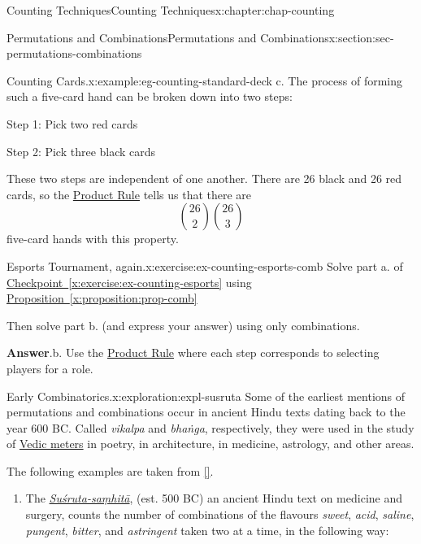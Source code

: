\documentclass[oneside,10pt,]{book}
\newcommand{\blocktitlefont}{\relax}
\newcommand{\xreffont}{\relax}
\newcommand{\pubtitle}[1]{\textsl{#1}}
\numberwithin{equation}{section}
\begin{document}
\begin{chapterptx}{Counting Techniques}{}{Counting Techniques}{}{}{x:chapter:chap-counting}
\begin{sectionptx}{Permutations and Combinations}{}{Permutations and Combinations}{}{}{x:section:sec-permutations-combinations}
\begin{example}{Counting Cards.}{x:example:eg-counting-standard-deck}
c. The process of forming such a five-card hand can be broken down into two steps:%
\begin{sidebyside}{2}{0.05}{0.05}{0.1}%
\begin{sbspanel}{0.4}%
Step 1: Pick two red cards%
\end{sbspanel}%
\begin{sbspanel}{0.4}%
\par
Step 2: Pick three black cards%
\end{sbspanel}%
\end{sidebyside}%
\par
These two steps are independent of one another. There are 26 black and 26 red cards, so the \hyperref[x:principle:prin-prod-rule]{Product Rule} tells us that there are%
\begin{equation*}
\binom{26}{2}\binom{26}{3}
\end{equation*}
five-card hands with this property.%
\end{example}
\begin{inlineexercise}{Esports Tournament, again.}{x:exercise:ex-counting-esports-comb}%
Solve part a. of \hyperref[x:exercise:ex-counting-esports]{Checkpoint~{\xreffont\ref{x:exercise:ex-counting-esports}}} using \hyperref[x:proposition:prop-comb]{Proposition~{\xreffont\ref{x:proposition:prop-comb}}}%
\par
Then solve part b. (and express your answer) using only combinations.%
\par\smallskip%
\noindent\textbf{\blocktitlefont Answer}.\hypertarget{g:answer:id332422}{}\quad{}b. Use the \hyperref[x:principle:prin-prod-rule]{Product Rule} where each step corresponds to selecting players for a role.%
\end{inlineexercise}
\begin{exploration}{Early Combinatorics.}{x:exploration:expl-susruta}%
Some of the earliest mentions of permutations and combinations occur in ancient Hindu texts dating back to the year 600 BC. Called \emph{vikalpa} and \emph{bhaṅga}, respectively, they were used in the study of \href{https://en.wikipedia.org/wiki/Sanskrit_prosody}{Vedic meters} in poetry, in architecture, in medicine, astrology, and other areas.%
\par
The following examples are taken from \hyperlink{x:biblio:bib-kolachana-2019}{[{\xreffont 2}]}.%
\begin{enumerate}[font=\bfseries,label=(\alph*),ref=\alph*]
\item{}The \href{https://en.wikipedia.org/wiki/Sushruta_Samhita}{\pubtitle{Suśruta-saṃhitā}}, (est. 500 BC) an ancient Hindu text on medicine and surgery, counts the number of combinations of the flavours \emph{sweet}, \emph{acid}, \emph{saline}, \emph{pungent}, \emph{bitter}, and \emph{astringent} taken two at a time, in the following way:%

\end{enumerate}
\end{exploration}
\end{sectionptx}
\end{chapterptx}
\end{document}
